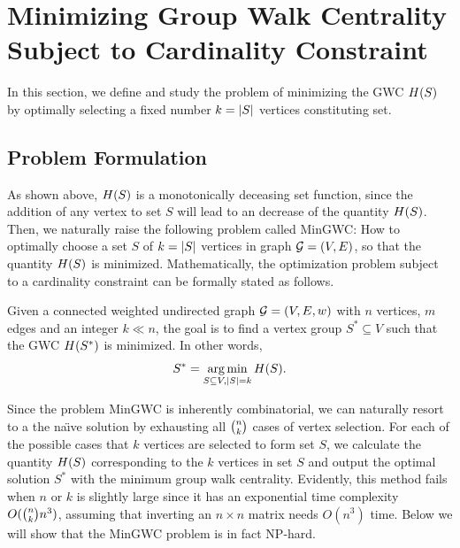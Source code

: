 \documentclass[10pt,twocolumn,twoside]{IEEEtran}
\begin{document}
\section{Minimizing  Group Walk Centrality Subject to Cardinality Constraint }

In this section, we define and study the problem of minimizing the GWC \(H(S)\) by optimally  selecting a fixed number $k=\left|S \right|$ vertices constituting set.

\subsection{Problem Formulation}

As shown above, \(H(S)\) is a monotonically deceasing set function, since the addition of any vertex to set $S$ will lead to an decrease of the quantity \(H(S)\). Then, we naturally raise the following problem called MinGWC: How to optimally choose a set \(S\) of \(k=\left|S \right|\) vertices in graph \(\mathcal{G}=(V,E)\), so that the quantity \(H(S)\) is minimized. Mathematically, the optimization problem subject to a cardinality constraint can be formally stated as follows.



\begin{problem}
Given a connected weighted undirected graph \(\mathcal{G}=(V,E,w)\) with \(n\) vertices, \(m\) edges and an integer \(k\ll n\), the goal is to find a vertex group \(S^*\subseteq V\) such that the GWC \(H(S^*)\) is minimized. In other words,
\begin{equation*}
    S^*=\operatorname*{arg\,min}_{S\subseteq V,\left|S \right|=k}H(S).
\end{equation*}
\end{problem}


Since the problem MinGWC is inherently combinatorial, we can naturally resort to a the na\"{\i}ve solution by exhausting all $\tbinom{n}{k}$ cases of vertex selection. For each of the possible cases that $k$ vertices are selected to form set $S$, we calculate the quantity \(H(S)\) corresponding to the $k$ vertices in set $S$ and output the optimal solution $S^*$ with the minimum group walk centrality. Evidently, this method fails when $n$ or $k$ is slightly large since it has an exponential time complexity $O(\tbinom{n}{k}n^3)$, assuming that inverting an $n \times n$ matrix needs $O(n^3)$  time. Below we will show that the  MinGWC problem is in fact NP-hard.
\end{document}
